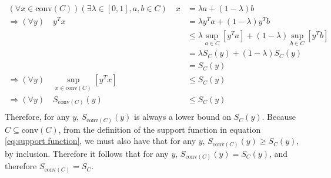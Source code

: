 \begin{align*}
    (\forall x\in\text{conv}(C))(\exists \lambda\in[0, 1], a, b\in C) \quad x &= \lambda a + (1 - \lambda) b \\
    \Rightarrow(\forall y) \quad y^T x &= \lambda y^T a + (1 - \lambda) y^T b \\
    & \le \lambda \underset{a\in C}{\sup}\left[ y^T a \right] + (1 - \lambda) \underset{b\in C}{\sup}\left[ y^T b \right] \\
    &= \lambda S_C(y) + (1 - \lambda) S_C(y) \\
    &= S_C(y) \\
    \Rightarrow(\forall y) \quad \underset{x\in\text{conv}(C)}{\sup}\left[ y^T x \right] &\le S_C(y) \\
    \Rightarrow(\forall y) \quad S_{\text{conv}(C)}(y) &\le S_C(y) \\
\end{align*}
Therefore, for any $y$, $S_{\text{conv}(C)}(y)$ is always a lower bound on $S_C(y)$. Because $C \subseteq \text{conv}(C)$, from the definition of the support function in equation \ref{eq:support function}, we must also have that for any $y$, $S_{\text{conv}(C)}(y) \ge S_C(y)$, by inclusion. Therefore it follows that for any $y$, $S_{\text{conv}(C)}(y) = S_C(y)$, and therefore $S_{\text{conv}(C)} = S_C$.

